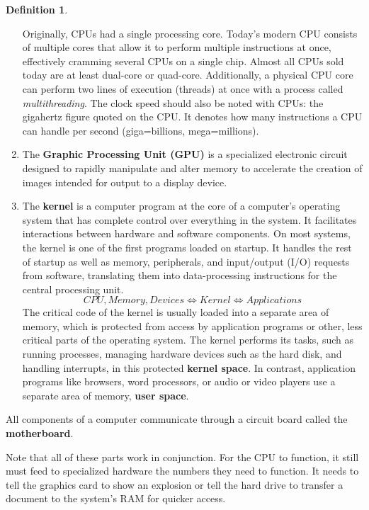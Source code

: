\documentclass[a4paper, 12pt]{report}
\theoremstyle{remark}
\theoremstyle{definition}
\newtheorem{definition}{Definition}[section]
\begin{document}
\begin{definition}
\begin{enumerate}
    Originally, CPUs had a single processing core. Today’s modern CPU consists of multiple cores that allow it to perform multiple instructions at once, effectively cramming several CPUs on a single chip. Almost all CPUs sold today are at least dual-core or quad-core. Additionally, a physical CPU core can perform two lines of execution (threads) at once with a process called \textit{multithreading}. The clock speed should also be noted with CPUs: the gigahertz figure quoted on the CPU. It denotes how many instructions a CPU can handle per second (giga=billions, mega=millions). 
    
    \item The \textbf{Graphic Processing Unit (GPU)} is a specialized electronic circuit designed to rapidly manipulate and alter memory to accelerate the creation of images intended for output to a display device. 
    
    \item The \textbf{kernel} is a computer program at the core of a computer's operating system that has complete control over everything in the system. It facilitates interactions between hardware and software components. On most systems, the kernel is one of the first programs loaded on startup. It handles the rest of startup as well as memory, peripherals, and input/output (I/O) requests from software, translating them into data-processing instructions for the central processing unit.
    \[CPU, Memory, Devices \iff Kernel \iff Applications\]
    The critical code of the kernel is usually loaded into a separate area of memory, which is protected from access by application programs or other, less critical parts of the operating system. The kernel performs its tasks, such as running processes, managing hardware devices such as the hard disk, and handling interrupts, in this protected \textbf{kernel space}. In contrast, application programs like browsers, word processors, or audio or video players use a separate area of memory, \textbf{user space}. 
\end{enumerate}
All components of a computer communicate through a circuit board called the \textbf{motherboard}. 
\end{definition}

Note that all of these parts work in conjunction. For the CPU to function, it still must feed to specialized hardware the numbers they need to function. It needs to tell the graphics card to show an explosion or tell the hard drive to transfer a document to the system’s RAM for quicker access.
\end{document}
